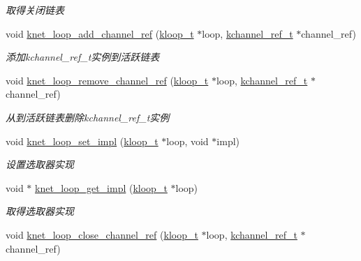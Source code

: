\begin{DoxyCompactItemize}
\begin{DoxyCompactList}\small\item\em 取得关闭链表 \end{DoxyCompactList}\item 
void \hyperlink{a00071_a59174eaaecf0028aeac92d919acb6cd7_a59174eaaecf0028aeac92d919acb6cd7}{knet\+\_\+loop\+\_\+add\+\_\+channel\+\_\+ref} (\hyperlink{a00053_a97fc76209a58362019f1ded9169e397f_a97fc76209a58362019f1ded9169e397f}{kloop\+\_\+t} $\ast$loop, \hyperlink{a00053_a3b7e82599367eade261456f60ebe2cd9_a3b7e82599367eade261456f60ebe2cd9}{kchannel\+\_\+ref\+\_\+t} $\ast$channel\+\_\+ref)
\begin{DoxyCompactList}\small\item\em 添加kchannel\+\_\+ref\+\_\+t实例到活跃链表 \end{DoxyCompactList}\item 
void \hyperlink{a00071_a5f2c16d159cea62a75e2d07927a346bd_a5f2c16d159cea62a75e2d07927a346bd}{knet\+\_\+loop\+\_\+remove\+\_\+channel\+\_\+ref} (\hyperlink{a00053_a97fc76209a58362019f1ded9169e397f_a97fc76209a58362019f1ded9169e397f}{kloop\+\_\+t} $\ast$loop, \hyperlink{a00053_a3b7e82599367eade261456f60ebe2cd9_a3b7e82599367eade261456f60ebe2cd9}{kchannel\+\_\+ref\+\_\+t} $\ast$channel\+\_\+ref)
\begin{DoxyCompactList}\small\item\em 从到活跃链表删除kchannel\+\_\+ref\+\_\+t实例 \end{DoxyCompactList}\item 
void \hyperlink{a00071_a24e13537994fbbf0920a20064f4d0d63_a24e13537994fbbf0920a20064f4d0d63}{knet\+\_\+loop\+\_\+set\+\_\+impl} (\hyperlink{a00053_a97fc76209a58362019f1ded9169e397f_a97fc76209a58362019f1ded9169e397f}{kloop\+\_\+t} $\ast$loop, void $\ast$impl)
\begin{DoxyCompactList}\small\item\em 设置选取器实现 \end{DoxyCompactList}\item 
void $\ast$ \hyperlink{a00071_a7692aa019b3ad845242804e7633b4849_a7692aa019b3ad845242804e7633b4849}{knet\+\_\+loop\+\_\+get\+\_\+impl} (\hyperlink{a00053_a97fc76209a58362019f1ded9169e397f_a97fc76209a58362019f1ded9169e397f}{kloop\+\_\+t} $\ast$loop)
\begin{DoxyCompactList}\small\item\em 取得选取器实现 \end{DoxyCompactList}\item 
void \hyperlink{a00071_ad0afd1d89a38d015b3b28127a1e7dce4_ad0afd1d89a38d015b3b28127a1e7dce4}{knet\+\_\+loop\+\_\+close\+\_\+channel\+\_\+ref} (\hyperlink{a00053_a97fc76209a58362019f1ded9169e397f_a97fc76209a58362019f1ded9169e397f}{kloop\+\_\+t} $\ast$loop, \hyperlink{a00053_a3b7e82599367eade261456f60ebe2cd9_a3b7e82599367eade261456f60ebe2cd9}{kchannel\+\_\+ref\+\_\+t} $\ast$channel\+\_\+ref)

\end{DoxyCompactItemize}
